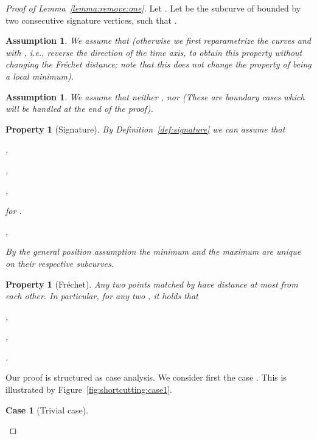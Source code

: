 \documentclass[11pt, letter]{article}
\newtheorem{case}[]{Case}
\newtheorem{assumption}[]{Assumption}
\newtheorem{property}[]{Property}
\newcommand{\lemref}[1]{Lemma~\ref{lemma:#1}}
\newcommand{\figref}[1]{Figure~\ref{fig:#1}}
\newcommand{\defref}[1]{Definition~\ref{def:#1}}
\newcommand{\asslab}[1]{\label{ass:#1}}
\newcommand{\proplab}[1]{\label{prop:#1}}
\newcommand{\Frechet}{Fr\'echet\xspace}
\begin{document}
\begin{proof}[Proof of \lemref{remove:one}]
Let . 
Let  be the subcurve of  bounded by two
consecutive signature vertices, such that .

\begin{assumption}
We assume that  (otherwise we first reparametrize
the curves  and  with , i.e., reverse the direction of
the time axis, to obtain this property without changing the \Frechet distance;
note that this does not change the property of  being a local
minimum).
\asslab{sign:edge:asc}
\end{assumption}

\begin{assumption}
We assume that neither , nor  (These are boundary cases which
will be handled at the end of the proof).
\asslab{inner:sig:edge}
\end{assumption}

\begin{property}[Signature]
By \defref{signature} we can assume that 
\begin{compactenum}[(i)] 
\item ,\label{item:sig:length}
\item ,\label{item:sig:sj:min}
\item ,\label{item:sig:sj1:max}
\item  for .\label{item:sig:descent}
\item ,\label{item:sig:length:2}
\end{compactenum}
By the general position assumption the minimum  and the maximum
 are unique on their respective subcurves.
\proplab{signature}
\end{property}

\begin{property}[\Frechet]
Any two points matched by  have distance at most  from each other.
In particular, for any two , it holds that
\begin{compactenum}[(i)] 
\item ,\label{item:frechet:dist}
\item ,\label{item:frechet:min}
\item .\label{item:frechet:max}
\end{compactenum} 
\proplab{frechet}
\end{property}

Our proof is structured as case analysis. We consider first the case .
This is illustrated by \figref{shortcutting:case1}. 

\begin{case}[Trivial case]


\end{case}
\end{proof}
\end{document}
